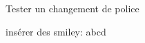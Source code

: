 \documentclass[12pt]{book}
\newcommand{\smiley}[1]{{\Smielyfnt #1}}
\begin{document}
Tester un changement de police


insérer des smiley: \smiley{abcd}
\end{document}
